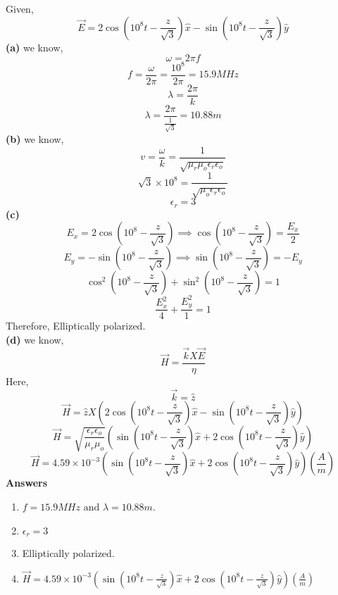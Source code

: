 \documentclass[a4paper]{article}
\begin{document}
    \begin{answer}[Question 5]
        Given,
        \[
            \vec{E}  = 2 \cos (10^8 t - \frac{z}{\sqrt{3} })\hat{x} - \sin (10^8 t - \frac{z}{\sqrt{3} }) \hat{y} 
        \]
        \textbf{(a)} 
        we know,
        \begin{equation}
            \boxed{\omega = 2 \pi f}
        \end{equation}
        \[
            f = \frac{\omega}{2 \pi} = \frac{10^8}{2 \pi} = 15.9 MHz 
        \]
        \begin{equation}
            \boxed{\lambda = \frac{2\pi}{k}}
        \end{equation}
        \[
            \lambda = \frac{2\pi}{\frac{1}{\sqrt{3} }} = 10.88 m
        \]
        \textbf{(b)} we know,
        \begin{equation}
            \boxed{v = \frac{\omega}{k} = \frac{1}{\sqrt{\mu_r \mu_o \epsilon_r \epsilon_o} } }
        \end{equation}
        \[
            \sqrt{3}\times10^8 =  \frac{1}{\sqrt{\mu_o \epsilon_r \epsilon_o} }
        \]
        \[
            \epsilon_r = 3
        \]
        \textbf{(c)} 
        \[
            E_x = 2 \cos (10^8 - \frac{z}{\sqrt{3} }) \implies \cos (10^8 - \frac{z}{\sqrt{3} }) = \frac{E_{x} }{2}
        \] 
        \[
            E_y = - \sin (10^8 - \frac{z}{\sqrt{3} }) \implies \sin (10^8 - \frac{z}{\sqrt{3} }) = - E_y
        \]
        \[
            \cos^2(10^8 - \frac{z}{\sqrt{3} }) + \sin ^2 (10^8 - \frac{z}{\sqrt{3} }) = 1 
        \]
        \[
            \frac{E_{x}^2 }{4} + \frac{E_{y} ^2}{1} = 1
        \]
        Therefore, Elliptically polarized. \\
        \textbf{(d)} 
        we know,
        \begin{equation}
            \boxed{\vec{H} = \frac{\vec{k}X\vec{E}}{\eta}}
        \end{equation}
        Here, 
        \[
            \vec{k} = \hat{z} 
        \]
        \[
            \vec{H} = \hat{z} X  (2 \cos (10^8 t - \frac{z}{\sqrt{3} })\hat{x} - \sin (10^8 t - \frac{z}{\sqrt{3} }) \hat{y}) 
        \]
        \[
            \vec{H} = \sqrt{\frac{\epsilon _r \epsilon_{o} }{\mu_r\mu_{o} }}(\sin (10^8 t - \frac{z}{\sqrt{3} }) \hat{x}+2 \cos (10^8 t - \frac{z}{\sqrt{3} })\hat{y}) 
        \]
        \[
            \vec{H} = 4.59\times 10^{-3 } (\sin (10^8 t - \frac{z}{\sqrt{3} }) \hat{x}+2 \cos (10^8 t - \frac{z}{\sqrt{3} })\hat{y}) \left(\frac{A}{m}\right) 
        \]
    \textbf{Answers}

        \begin{enumerate}
		\item \({f = 15.9 MHz \text{ and } \lambda = 10.88m}\).
        \item \({\epsilon _r = 3}\) 
        \item Elliptically polarized. 
        \item $\vec{H} = 4.59\times 10^{-3 } (\sin (10^8 t - \frac{z}{\sqrt{3} }) \hat{x}+2 \cos (10^8 t - \frac{z}{\sqrt{3} })\hat{y}) \left(\frac{A}{m}\right)$
        \end{enumerate}
    \end{answer}
\end{document}
